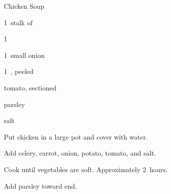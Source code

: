 \begin{recipe}{Chicken Soup}{}{}

\begin{ingredients}
\item {}
\item 1~stalk of 
\item 1~
\item 1~small onion
\item 1~, peeled
\item tomato, sectioned
\item parsley
\item salt
\end{ingredients}

\begin{directions}
\item Put chicken in a large pot and cover with water.
\item Add celery, carrot, onion, potato, tomato, and salt.
\item Cook until vegetables are soft. Approximately 2~hours.
\item Add parsley toward end.
\end{directions}

\end{recipe}
